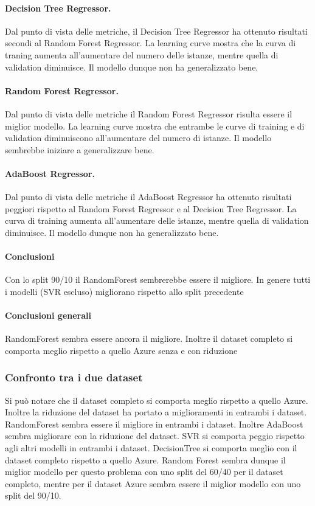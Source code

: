 \paragraph{\textbf{Decision Tree Regressor}.}
Dal punto di vista delle metriche, il Decision Tree Regressor ha ottenuto risultati secondi al Random Forest Regressor.
La learning curve mostra che la curva di traning aumenta all'aumentare del numero delle istanze, mentre quella di validation diminuisce. Il modello dunque non ha generalizzato bene.
\paragraph{\textbf{Random Forest Regressor}.}
Dal punto di vista delle metriche il Random Forest Regressor risulta essere il miglior modello.
La learning curve mostra che entrambe le curve di training e di validation diminuiscono all'aumentare del numero di istanze. Il modello sembrebbe iniziare a generalizzare bene.
\paragraph{\textbf{AdaBoost Regressor}.}
Dal punto di vista delle metriche il AdaBoost Regressor ha ottenuto risultati peggiori rispetto al Random Forest Regressor e al Decision Tree Regressor. La curva di training aumenta all'aumentare delle istanze, mentre quella di validation diminuisce. Il modello dunque non ha generalizzato bene.

\paragraph{\textbf{Conclusioni}} Con lo split 90/10 il RandomForest sembrerebbe essere il migliore. In genere tutti i modelli (SVR escluso) migliorano rispetto allo split precedente

\paragraph{\textbf{Conclusioni generali}}
RandomForest sembra essere ancora il migliore.
Inoltre il dataset completo si comporta meglio rispetto a quello Azure senza e con riduzione


\subsubsection{Confronto tra i due dataset}
Si può notare che il dataset completo si comporta meglio rispetto a quello Azure. Inoltre la riduzione del dataset ha portato a miglioramenti in entrambi i dataset. RandomForest sembra essere il migliore in entrambi i dataset. Inoltre AdaBoost sembra migliorare con la riduzione del dataset. SVR si comporta peggio rispetto agli altri modelli in entrambi i dataset. DecisionTree si comporta meglio con il dataset completo rispetto a quello Azure. Random Forest sembra dunque il miglior modello per questo problema con uno split del 60/40 per il dataset completo, mentre per il dataset Azure sembra essere il miglior modello con uno split del 90/10.
